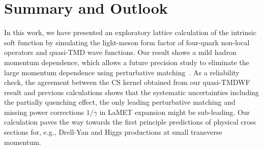 \section{Summary and Outlook}
In this work, we have presented an exploratory lattice calculation of the intrinsic
soft function by simulating the light-meson form factor of four-quark non-local operators and quasi-TMD wave functions. Our result shows a mild hadron momentum dependence, which allows a future precision study to eliminate the large momentum dependence using perturbative matching~{\cite{Ji:2020ect}}.
As a reliability check, the agreement between the CS kernel obtained from our quasi-TMDWF result  and   previous calculations shows that the systematic uncertainties {including the partially quenching effect,} the only leading  perturbative matching and missing power corrections $1/\gamma$ in LaMET expansion {might be} sub-leading. Our calculation paves the way towards the first principle predictions of   physical cross sections  for, e.g., Drell-Yan and Higgs productions at small transverse momentum.


\vspace{0.5cm}
